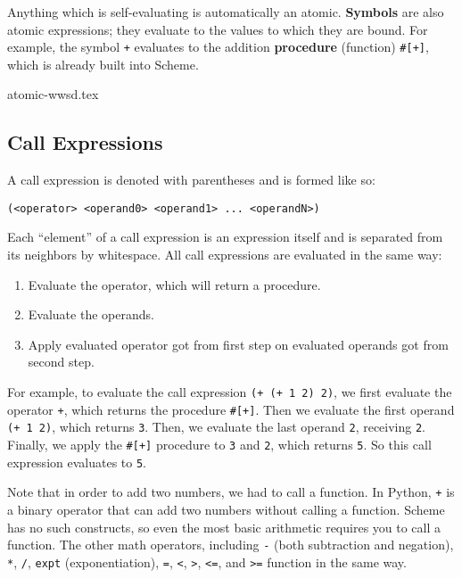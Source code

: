 Anything which is self-evaluating is automatically an atomic.
\textbf{Symbols} are also atomic expressions; they evaluate to the values to which they are bound. For example, the symbol \lstinline{+} evaluates to the addition \textbf{procedure} (function) \lstinline{#[+]}, which is already built into Scheme. 

{atomic-wwsd.tex}


\subsection{Call Expressions}

A call expression is denoted with parentheses and is formed like so:
\vspace{0.5mm}
\begin{lstlisting}
(<operator> <operand0> <operand1> ... <operandN>)
\end{lstlisting}
Each ``element'' of a call expression is an expression itself and is separated from its neighbors by whitespace. All call expressions are evaluated in the same way:
\begin{enumerate}
\item Evaluate the operator, which will return a procedure.
\item Evaluate the operands.
\item Apply evaluated operator got from first step on evaluated operands got from second step.
\end{enumerate}
For example, to evaluate the call expression \lstinline{(+ (+ 1 2) 2)}, we first evaluate the operator \lstinline{+}, which returns the procedure \lstinline{#[+]}. Then we evaluate the first operand \lstinline{(+ 1 2)}, which returns \lstinline{3}. Then, we evaluate the last operand \lstinline{2}, receiving \lstinline{2}. Finally, we apply the \lstinline{#[+]} procedure to \lstinline{3} and \lstinline{2}, which returns \lstinline{5}. So this call expression evaluates to \lstinline{5}. 

Note that in order to add two numbers, we had to call a function. In Python, \lstinline{+} is a binary operator that can add two numbers without calling a function. Scheme has no such constructs, so even the most basic arithmetic requires you to call a function. The other math operators, including \lstinline{-} (both subtraction and negation), \lstinline{*}, \lstinline{/}, \lstinline{expt} (exponentiation), \lstinline{=}, \lstinline{<}, \lstinline{>}, \lstinline{<=}, and \lstinline{>=} function in the same way. 

